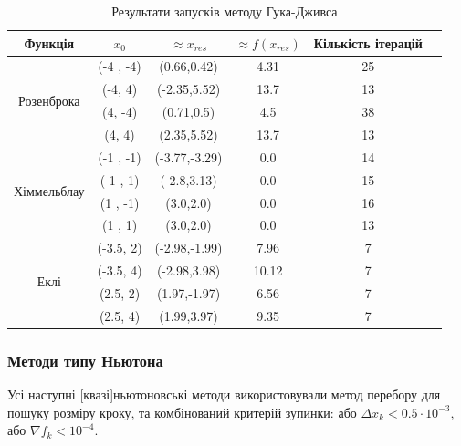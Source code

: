 \begin{table}[h!]
    \centering
    \begin{tabular}{|c|c|c|c|c|c|}
        \hline
        \textbf{Функція} & $x_0$ & $\approx x_{res}$ & $\approx f(x_{res})$ & \textbf{Кількість ітерацій}  \\
        \hline
        \multirow{4}{*}{Розенброка} & (-4 , -4) & (0.66,0.42) & 4.31 & 25 \\
        \cline{2-5}
        & (-4, 4) & (-2.35,5.52) & 13.7 & 13 \\
        \cline{2-5}
        & (4, -4) & (0.71,0.5) & 4.5 & 38 \\
        \cline{2-5}
        & (4, 4) & (2.35,5.52) & 13.7 & 13 \\
        \hline
        \multirow{4}{*}{Хіммельблау} & (-1 , -1) & (-3.77,-3.29) & 0.0 & 14 \\
        \cline{2-5}
        & (-1 , 1) & (-2.8,3.13) & 0.0 & 15 \\
        \cline{2-5}
        & (1 , -1) & (3.0,2.0) & 0.0 & 16 \\
        \cline{2-5}
        & (1 , 1) & (3.0,2.0) & 0.0 & 13 \\
        \hline
        \multirow{4}{*}{Еклі} & (-3.5, 2) & (-2.98,-1.99) & 7.96 & 7 \\
        \cline{2-5}
        & (-3.5, 4) & (-2.98,3.98) & 10.12 & 7
        \\ \cline{2-5}
        & (2.5, 2) &(1.97,-1.97) & 6.56 & 7
        \\ \cline{2-5}
        & (2.5, 4) & (1.99,3.97) & 9.35 & 7
        \\ \hline
    \end{tabular}
    \caption{Результати запусків методу Гука-Дживса}
\end{table}

\subsubsection*{Методи типу Ньютона}

Усі наступні [квазі]ньютоновські методи використовували
метод перебору для пошуку розміру кроку, та
комбінований критерій зупинки:
або $\Delta x_k < 0.5 \cdot 10^{-3}$,
або $\nabla f_k < 10^{-4}$.

